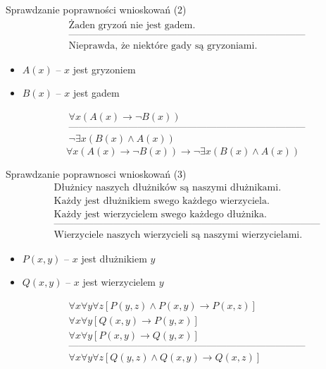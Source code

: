 \documentclass{beamer}
\begin{document}
\begin{frame}{Sprawdzanie poprawności wnioskowań (2)}
%
\begin{eqnarray*}
& \textrm{Żaden gryzoń nie jest gadem.} \nonumber \\
& \textrm{------------------------------------------------------------------------}\nonumber \\
& \textrm{Nieprawda, że niektóre gady są gryzoniami.}
\end{eqnarray*}
%
\begin{itemize}
\item $A(x)$ -- $x$ jest gryzoniem
\item $B(x)$ -- $x$ jest gadem
\end{itemize}
%
\begin{eqnarray*}
& \forall x (A(x) \to \neg B(x)) \nonumber \\
& \textrm{------------------------------------------------------------------------}\nonumber \\
& \neg \exists x (B(x) \land A(x))
\end{eqnarray*}
%
$$\forall x (A(x) \to \neg B(x)) \to \neg \exists x (B(x) \land A(x))$$
\end{frame}

\begin{frame}{Sprawdzanie poprawnosci wnioskowań (3)}
%
\begin{eqnarray*}
& \textrm{Dłużnicy naszych dłużników są naszymi dłużnikami.}\nonumber \\
& \textrm{Każdy jest dłużnikiem swego każdego wierzyciela.}\nonumber \\
& \textrm{Każdy jest wierzycielem swego każdego dłużnika.}\nonumber \\
& \textrm{---------------------------------------------------------------------------------}\nonumber \\
& \textrm{Wierzyciele naszych wierzycieli są naszymi wierzycielami.}
\end{eqnarray*}
%
\begin{itemize}
\item $P(x,y)$ -- $x$ jest dłużnikiem $y$
\item$Q(x,y)$ -- $x$ jest wierzycielem $y$
\end{itemize}
%
\begin{eqnarray*}
& \forall x \forall y \forall z [P(y,z) \land P(x,y) \to P(x,z)] \nonumber \\
& \forall x \forall y [Q(x,y) \to P(y,x)] \nonumber \\
& \forall x \forall y [P(x,y) \to Q(y,x)] \nonumber \\
& \textrm{------------------------------------------------------------------------}\nonumber \\
& \forall x \forall y \forall z [Q(y,z) \land Q(x,y) \to Q(x,z)] \nonumber \\
\end{eqnarray*}
\end{frame}
\end{document}
